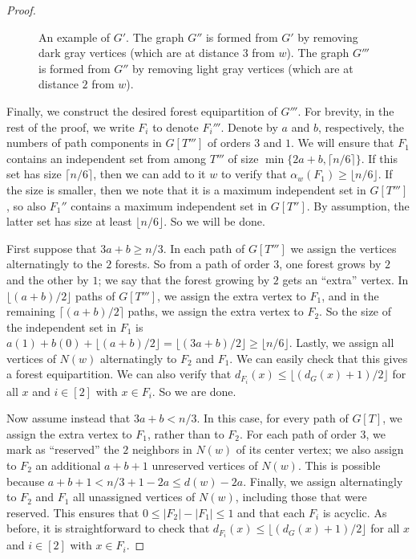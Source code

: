 \documentclass[11pt]{article}
\theoremstyle{definition}
\newcommand\floor[1]{\lfloor#1\rfloor}
\newcommand\ceil[1]{\lceil#1\rceil}
\renewcommand\ge\geqslant
\renewcommand\le\leqslant
\begin{document}
\begin{proof}
\begin{figure}[H]
        \caption{An example of $G'$.  The graph $G''$ is formed from $G'$ by removing dark gray vertices (which are at distance $3$ from $w$). 
	    The graph $G'''$ is formed from $G''$ by removing light gray vertices (which are at distance $2$ from $w$).} 
        \label{last-fig}
    \end{figure}

	Finally, we construct the desired forest equipartition of $G'''$.  For brevity, in the rest of the proof, we write $F_i$ to denote $F_i'''$.
	Denote by $a$ and $b$, respectively, the numbers of path components in $G[T''']$
	of orders $3$ and $1$.  We will ensure that $F_1$ contains an independent set from among $T'''$ of size $\min\{2a+b,\ceil{n/6}\}$.  If this set
	has size $\ceil{n/6}$, then we can add to it $w$ to verify that $\alpha_w(F_1)\ge \floor{n/6}$.  If the size is smaller, then we note that it is
	a maximum independent set in $G[T''']$, so also $F_1''$ contains a maximum independent set in $G[T'']$.  By assumption, the latter set has size at
	least $\floor{n/6}$.  So we will be done.

	First suppose that $3a+b\ge n/3$.  In each path of $G[T''']$ we assign the vertices alternatingly to the $2$ forests.  So from a path of order $3$, 
	one forest grows by $2$ and the other by $1$; we say that the forest growing by $2$ gets an ``extra'' vertex.  In $\floor{(a+b)/2}$ paths of 
	$G[T''']$, we assign the extra vertex to $F_1$, and in the remaining $\ceil{(a+b)/2}$ paths, we assign the extra vertex to $F_2$.
	So the size of the independent set in $F_1$ is $a(1)+b(0)+\floor{(a+b)/2} = \floor{(3a+b)/2} \ge \floor{n/6}$.  Lastly, we assign all
	vertices of $N(w)$ alternatingly to $F_2$ and $F_1$. We can easily check that this gives a forest equipartition.  We can also verify that 
	$d_{F_i}(x)\le \floor{(d_G(x)+1)/2}$ for all $x$ and $i\in[2]$ with $x\in F_i$.  So we are done.

	Now assume instead that $3a+b < n/3$.  In this case, for every path of $G[T]$, we assign the extra vertex to $F_1$, rather than to $F_2$.  
	For each path of order $3$, we mark as ``reserved'' the $2$ neighbors in $N(w)$ of its center vertex; we also assign to $F_2$ an additional 
	$a+b+1$ unreserved 
	vertices of $N(w)$.  This is possible because $a+b+1 < n/3+1 - 2a \le d(w)-2a$.  Finally, we assign alternatingly to $F_2$ and $F_1$ all 
	unassigned vertices of $N(w)$, including those that were reserved.  This ensures that $0\le |F_2|-|F_1|\le 1$ and that each $F_i$ is acyclic.
	As before, it is straightforward to check that $d_{F_i}(x)\le \floor{(d_G(x)+1)/2}$ for all $x$ and $i\in [2]$ with $x\in F_i$.
\end{proof}

{\footnotesize{}}
\end{document}
